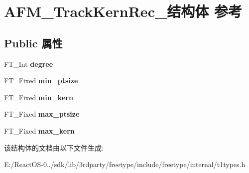 \hypertarget{struct_a_f_m___track_kern_rec__}{}\section{A\+F\+M\+\_\+\+Track\+Kern\+Rec\+\_\+结构体 参考}
\label{struct_a_f_m___track_kern_rec__}
\subsection*{Public 属性}
\begin{DoxyCompactItemize}
\item 
\mbox{\label{struct_a_f_m___track_kern_rec___a15272593c1a0ea05ca3687e7c2de26b6}} 
F\+T\+\_\+\+Int {\bfseries degree}
\item 
\mbox{\label{struct_a_f_m___track_kern_rec___a7b1e7fd74d92dcf2b89fee7f74d4fdba}} 
F\+T\+\_\+\+Fixed {\bfseries min\+\_\+ptsize}
\item 
\mbox{\label{struct_a_f_m___track_kern_rec___aee6f40c722e14ee2fb17948ce19d0499}} 
F\+T\+\_\+\+Fixed {\bfseries min\+\_\+kern}
\item 
\mbox{\label{struct_a_f_m___track_kern_rec___a2b22a268fb0654a035ec59d3dfa3dfa4}} 
F\+T\+\_\+\+Fixed {\bfseries max\+\_\+ptsize}
\item 
\mbox{\label{struct_a_f_m___track_kern_rec___a8e25a36b738a2de3fa5c08e477b5a6a2}} 
F\+T\+\_\+\+Fixed {\bfseries max\+\_\+kern}
\end{DoxyCompactItemize}


该结构体的文档由以下文件生成\+:\begin{DoxyCompactItemize}
\item 
E\+:/\+React\+O\+S-\/0../sdk/lib/3rdparty/freetype/include/freetype/internal/t1types.\+h\end{DoxyCompactItemize}
